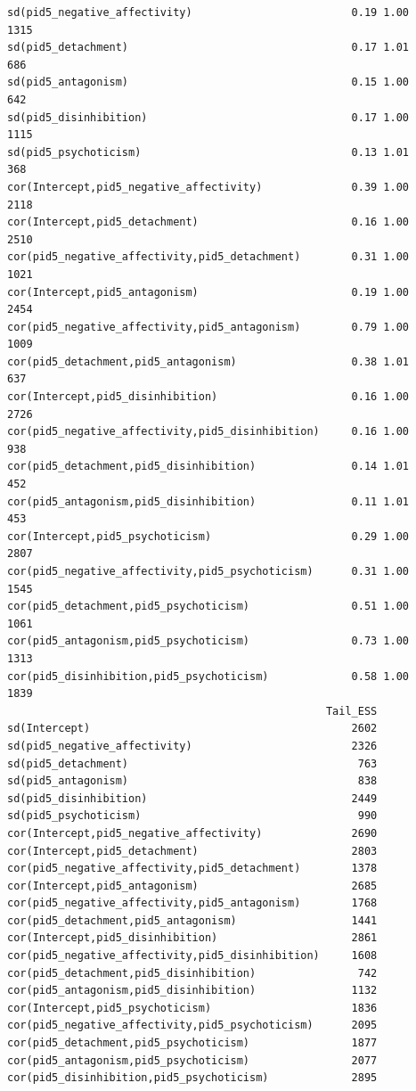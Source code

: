 \documentclass[
  11pt,
  a4paper,
  onecolumn]{article}
\begin{document}
\begin{verbatim}
sd(pid5_negative_affectivity)                         0.19 1.00     1315
sd(pid5_detachment)                                   0.17 1.01      686
sd(pid5_antagonism)                                   0.15 1.00      642
sd(pid5_disinhibition)                                0.17 1.00     1115
sd(pid5_psychoticism)                                 0.13 1.01      368
cor(Intercept,pid5_negative_affectivity)              0.39 1.00     2118
cor(Intercept,pid5_detachment)                        0.16 1.00     2510
cor(pid5_negative_affectivity,pid5_detachment)        0.31 1.00     1021
cor(Intercept,pid5_antagonism)                        0.19 1.00     2454
cor(pid5_negative_affectivity,pid5_antagonism)        0.79 1.00     1009
cor(pid5_detachment,pid5_antagonism)                  0.38 1.01      637
cor(Intercept,pid5_disinhibition)                     0.16 1.00     2726
cor(pid5_negative_affectivity,pid5_disinhibition)     0.16 1.00      938
cor(pid5_detachment,pid5_disinhibition)               0.14 1.01      452
cor(pid5_antagonism,pid5_disinhibition)               0.11 1.01      453
cor(Intercept,pid5_psychoticism)                      0.29 1.00     2807
cor(pid5_negative_affectivity,pid5_psychoticism)      0.31 1.00     1545
cor(pid5_detachment,pid5_psychoticism)                0.51 1.00     1061
cor(pid5_antagonism,pid5_psychoticism)                0.73 1.00     1313
cor(pid5_disinhibition,pid5_psychoticism)             0.58 1.00     1839
                                                  Tail_ESS
sd(Intercept)                                         2602
sd(pid5_negative_affectivity)                         2326
sd(pid5_detachment)                                    763
sd(pid5_antagonism)                                    838
sd(pid5_disinhibition)                                2449
sd(pid5_psychoticism)                                  990
cor(Intercept,pid5_negative_affectivity)              2690
cor(Intercept,pid5_detachment)                        2803
cor(pid5_negative_affectivity,pid5_detachment)        1378
cor(Intercept,pid5_antagonism)                        2685
cor(pid5_negative_affectivity,pid5_antagonism)        1768
cor(pid5_detachment,pid5_antagonism)                  1441
cor(Intercept,pid5_disinhibition)                     2861
cor(pid5_negative_affectivity,pid5_disinhibition)     1608
cor(pid5_detachment,pid5_disinhibition)                742
cor(pid5_antagonism,pid5_disinhibition)               1132
cor(Intercept,pid5_psychoticism)                      1836
cor(pid5_negative_affectivity,pid5_psychoticism)      2095
cor(pid5_detachment,pid5_psychoticism)                1877
cor(pid5_antagonism,pid5_psychoticism)                2077
cor(pid5_disinhibition,pid5_psychoticism)             2895


\end{verbatim}
\end{document}
